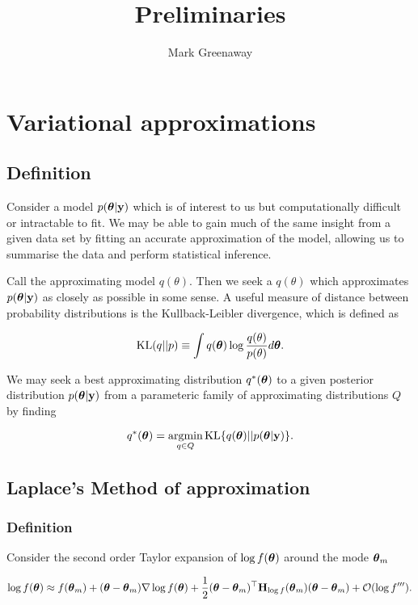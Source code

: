 \documentclass{article}[12pt]
\title{Preliminaries}
\author{Mark Greenaway}
\begin{document}
\setlength{\parindent}{0pt}
\maketitle

\section{Variational approximations}

\subsection{Definition}

Consider a model $p({\boldsymbol \theta}|{\bf y})$ which is of interest to us but computationally difficult or intractable to 
fit. We may be able to gain much of the same insight from a given data set by fitting an accurate approximation 
of the model, allowing us to summarise the data and perform statistical inference.

Call the approximating model $q(\theta)$. Then we seek a $q(\theta)$ which approximates $p({\boldsymbol \theta}|{\bf y})$
as closely as possible in some sense. A useful measure of distance between probability distributions is the
Kullback-Leibler divergence, which is defined as

$$
\text{KL}(q || p) \equiv \int q({\boldsymbol \theta}) \log{\frac{q(\theta)}{p(\theta)}} d {\boldsymbol \theta}.
$$

We may seek a best approximating distribution $q^*({\boldsymbol \theta})$ to a given posterior distribution
$p({\boldsymbol \theta}|{\bf y})$ from a parameteric family of approximating distributions $Q$ by finding

$$
q^*(\vtheta) = \argmin_{q \in Q} \KL \{ {q(\vtheta) || p(\vtheta|\vy)} \}.
$$


\subsection{Laplace's Method of approximation}

\subsubsection{Definition}

Consider the second order Taylor expansion of $\log f({\boldsymbol \theta})$ around the mode ${\boldsymbol \theta}_m$

$$
\log f({\boldsymbol \theta}) \approx f({\boldsymbol \theta}_m) + ({\boldsymbol \theta} - {\boldsymbol \theta}_m) \nabla \log f({\boldsymbol \theta}) + {\frac{1}{2}} ({\boldsymbol \theta} - {\boldsymbol \theta}_m)^\top {\bf H}_{\log f}({\boldsymbol \theta}_m) ({\boldsymbol \theta} - {\boldsymbol \theta}_m) + {\mathcal O}(\log f''').
$$
\end{document}
